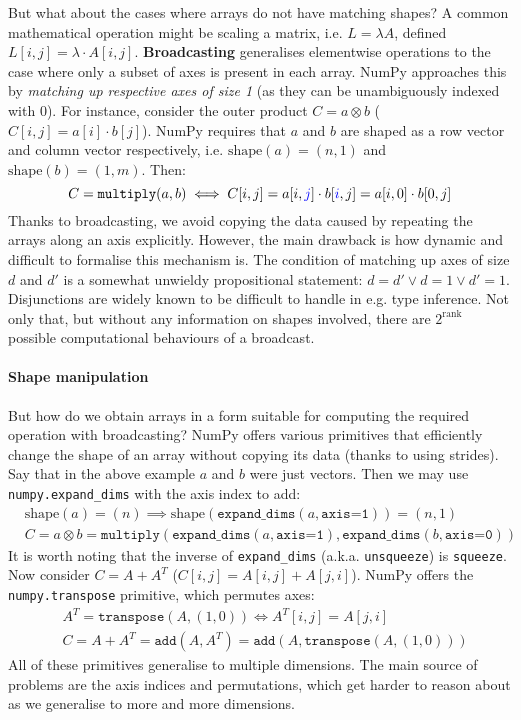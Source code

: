 But what about the cases where arrays do not have matching shapes? A common mathematical operation might be scaling a matrix, i.e. $L = \lambda A$, defined $L[i, j] = \lambda \cdot A[i, j]$. \textbf{Broadcasting} generalises elementwise operations to the case where only a subset of axes is present in each array. NumPy approaches this by \textit{matching up respective axes of size 1} (as they can be unambiguously indexed with $0$). For instance, consider the outer product $C = a \otimes b$ ($C[i, j] = a[i] \cdot b[j] $). NumPy requires that $a$ and $b$ are shaped as a row vector and column vector respectively, i.e. $\mathrm{shape}(a) = (n, 1)$ and $\mathrm{shape}(b) = (1, m)$. Then:
$$ C = \texttt{multiply}(a, b) \iff C[i, j] = a[i, {\color{blue} j}] \cdot b[{\color{blue} i}, j] = a[i, 0] \cdot b[0, j] $$
Thanks to broadcasting, we avoid copying the data caused by repeating the arrays along an axis explicitly. However, the main drawback is how dynamic and difficult to formalise this mechanism is. The condition of matching up axes of size $d$ and $d'$ is a somewhat unwieldy propositional statement: $d = d' \lor d = 1 \lor d' = 1 $. Disjunctions are widely known to be difficult to handle in e.g. type inference.
Not only that, but without any information on shapes involved, there are $2^{\mathrm{rank}}$ possible computational behaviours of a broadcast.

\paragraph{Shape manipulation} But how do we obtain arrays in a form suitable for computing the required operation with broadcasting? NumPy offers various primitives that efficiently change the shape of an array without copying its data (thanks to using strides). Say that in the above example $a$ and $b$ were just vectors. Then we may use \texttt{numpy.expand\_dims} with the axis index to add:
\begin{align*}
&\mathrm{shape}(a) = (n) \implies \mathrm{shape}(\texttt{expand\_dims}(a, \texttt{axis=1})) = (n, 1) \\
&C = a \otimes b = \texttt{multiply} \left( \texttt{expand\_dims}(a, \texttt{axis=1}), \texttt{expand\_dims}(b, \texttt{axis=0}) \right)
\end{align*}
It is worth noting that the inverse of \texttt{expand\_dims} (a.k.a. \texttt{unsqueeze}) is \texttt{squeeze}. Now consider $C = A + A^T$ ($C[i, j] = A[i, j] + A[j, i]$). NumPy offers the \texttt{numpy.transpose} primitive, which permutes axes:
\begin{align*}
&A^T = \texttt{transpose}(A, (1, 0)) \iff A^T[i, j] = A[j, i] \\
&C = A + A^T = \texttt{add}(A, A^T) = \texttt{add}(A, \texttt{transpose}(A, (1, 0))) 
\end{align*}
All of these primitives generalise to multiple dimensions. 
The main source of problems are the axis indices and permutations, which get harder to reason about as we generalise to more and more dimensions. 

